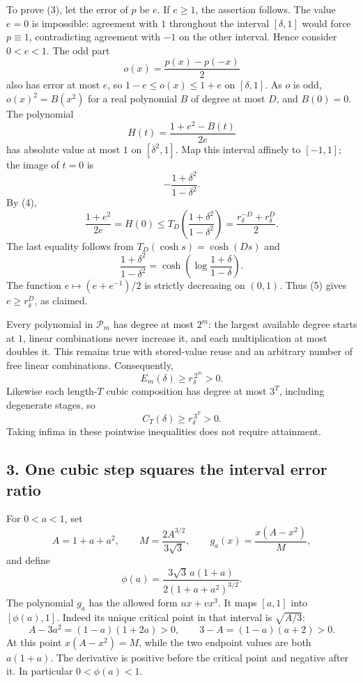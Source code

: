 \documentclass[10pt,a4paper]{article}
\begin{document}
To prove (3), let the error of \(p\) be \(e\). If \(e\ge1\), the
assertion follows. The value \(e=0\) is impossible: agreement with \(1\)
throughout the interval \([\delta,1]\) would force \(p\equiv1\),
contradicting agreement with \(-1\) on the other interval. Hence
consider \(0<e<1\). The odd part \[
o(x)=\frac{p(x)-p(-x)}2
\] also has error at most \(e\), so \(1-e\le o(x)\le1+e\) on
\([\delta,1]\). As \(o\) is odd, \(o(x)^2=B(x^2)\) for a real polynomial
\(B\) of degree at most \(D\), and \(B(0)=0\). The polynomial \[
H(t)=\frac{1+e^2-B(t)}{2e}
\] has absolute value at most \(1\) on \([\delta^2,1]\). Map this
interval affinely to \([-1,1]\); the image of \(t=0\) is \[
-\frac{1+\delta^2}{1-\delta^2}.
\] By (4), \[
\frac{1+e^2}{2e}=H(0)
\le T_D\!\left(\frac{1+\delta^2}{1-\delta^2}\right)
=\frac{r_\delta^{-D}+r_\delta^D}{2}.
\tag{5}
\] The last equality follows from \(T_D(\cosh s)=\cosh(Ds)\) and \[
\frac{1+\delta^2}{1-\delta^2}
=\cosh\!\left(\log\frac{1+\delta}{1-\delta}\right).
\] The function \(e\mapsto(e+e^{-1})/2\) is strictly decreasing on
\((0,1)\). Thus (5) gives \(e\ge r_\delta^D\), as claimed.

Every polynomial in \(\mathcal P_m\) has degree at most \(2^m\): the
largest available degree starts at \(1\), linear combinations never
increase it, and each multiplication at most doubles it. This remains
true with stored-value reuse and an arbitrary number of free linear
combinations. Consequently, \[
E_m(\delta)\ge r_\delta^{\,2^m}>0.
\tag{6}
\] Likewise each length-\(T\) cubic composition has degree at most
\(3^T\), including degenerate stages, so \[
C_T(\delta)\ge r_\delta^{\,3^T}>0.
\tag{7}
\] Taking infima in these pointwise inequalities does not require
attainment.


\subsection{3. One cubic step squares the interval error
ratio}\label{one-cubic-step-squares-the-interval-error-ratio}

For \(0<a<1\), set \[
A=1+a+a^2,\qquad
M=\frac{2A^{3/2}}{3\sqrt3},\qquad
g_a(x)=\frac{x(A-x^2)}M,
\] and define \[
\phi(a)=\frac{3\sqrt3\,a(1+a)}
                  {2(1+a+a^2)^{3/2}}.
\tag{8}
\] The polynomial \(g_a\) has the allowed form \(ux+vx^3\). It maps
\([a,1]\) into \([\phi(a),1]\). Indeed its unique critical point in that
interval is \(\sqrt{A/3}\): \[
A-3a^2=(1-a)(1+2a)>0,\qquad
3-A=(1-a)(a+2)>0.
\] At this point \(x(A-x^2)=M\), while the two endpoint values are both
\(a(1+a)\). The derivative is positive before the critical point and
negative after it. In particular \(0<\phi(a)<1\).
\end{document}
